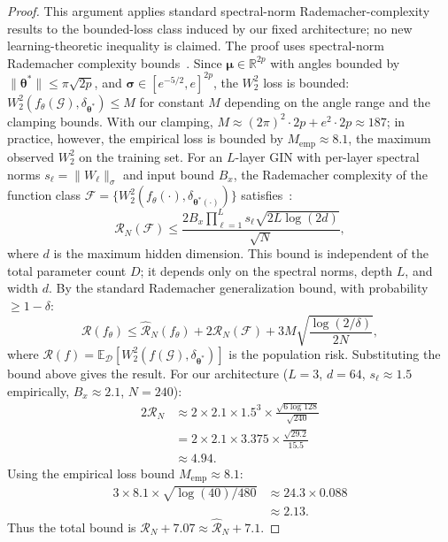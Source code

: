 \documentclass[aps,prx,reprint,superscriptaddress,longbibliography]{revtex4-2}
\newcommand{\GIN}{\textnormal{\textsc{GIN}}}
\newcommand{\calG}{\mathcal{G}}
\newcommand{\calD}{\mathcal{D}}
\newcommand{\calF}{\mathcal{F}}
\newcommand{\calR}{\mathcal{R}}
\newcommand{\bbR}{\mathbb{R}}
\newcommand{\bbE}{\mathbb{E}}
\begin{document}
\begin{proof}
This argument applies standard spectral-norm Rademacher-complexity
results to the bounded-loss class induced by our fixed architecture;
no new learning-theoretic inequality is claimed. The proof uses
spectral-norm Rademacher complexity
bounds~\cite{bartlett2017,neyshabur2018,golowich2018}.
Since $\bm\mu \in \bbR^{2p}$ with angles bounded by
$\|\bm\theta^*\| \le \pi\sqrt{2p}$, and
$\bm\sigma \in [e^{-5/2}, e]^{2p}$, the $W_2^2$ loss is bounded:
$W_2^2(f_\theta(\calG), \delta_{\bm\theta^*}) \le M$ for
constant $M$ depending on the angle range and the clamping bounds.
With our clamping, $M \approx (2\pi)^2 \cdot 2p + e^2 \cdot 2p \approx 187$;
in practice, however, the empirical loss is bounded by
$M_{\mathrm{emp}} \approx 8.1$, the maximum observed $W_2^2$ on the
training set.
For an $L$-layer \GIN{} with per-layer spectral norms
$s_\ell = \|W_\ell\|_\sigma$ and input bound $B_x$,
the Rademacher complexity of the function class
$\calF = \{W_2^2(f_\theta(\cdot), \delta_{\bm\theta^*(\cdot)})\}$
satisfies~\cite{bartlett2017,golowich2018}:
\begin{equation*}
    \calR_N(\calF) \le \frac{2 B_x \prod_{\ell=1}^{L} s_\ell
    \sqrt{2L\log(2d)}}{\sqrt{N}},
\end{equation*}
where $d$ is the maximum hidden dimension.
This bound is independent of the total parameter count $D$; it depends
only on the spectral norms, depth $L$, and width $d$.
By the standard Rademacher generalization bound, with probability
$\ge 1 - \delta$:
\begin{equation*}
    \calR(f_\theta) \le \hat{\calR}_N(f_\theta)
    + 2\calR_N(\calF) + 3M\sqrt{\frac{\log(2/\delta)}{2N}},
\end{equation*}
where $\calR(f) = \bbE_\calD[W_2^2(f(\calG),
\delta_{\bm\theta^*})]$ is the population risk.
Substituting the bound above gives the result.
For our architecture ($L{=}3$, $d{=}64$,
$s_\ell \approx 1.5$ empirically,
$B_x \approx 2.1$, $N{=}240$):
\begin{equation*}
    \begin{aligned}
    2\calR_N
    &\approx 2 \times 2.1 \times 1.5^3
    \times \frac{\sqrt{6\log 128}}{\sqrt{240}} \\
    &= 2 \times 2.1 \times 3.375
    \times \frac{\sqrt{29.2}}{15.5} \\
    &\approx 4.94.
    \end{aligned}
\end{equation*}
Using the empirical loss bound $M_{\mathrm{emp}} \approx 8.1$:
\begin{equation*}
    \begin{aligned}
    3 \times 8.1 \times \sqrt{\log(40)/480}
    &\approx 24.3 \times 0.088 \\
    &\approx 2.13.
    \end{aligned}
\end{equation*}
Thus the total bound is $\hat{\calR}_N + 7.07 \approx \hat{\calR}_N + 7.1$.


\end{proof}
\end{document}
